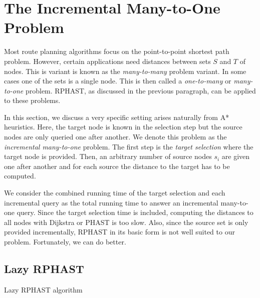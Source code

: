 \documentclass[a4paper,UKenglish,cleveref, autoref, thm-restate]{lipics-v2021}
\begin{document}
\section{The Incremental Many-to-One Problem}\label{sec:lazy-rphast}

Most route planning algorithms focus on the point-to-point shortest path problem.
However, certain applications need distances between sets $S$ and $T$ of nodes.
This is variant is known as the \emph{many-to-many} problem variant.
In some cases one of the sets is a single node.
This is then called a \emph{one-to-many} or \emph{many-to-one} problem.
RPHAST, as discussed in the previous paragraph, can be applied to these problems.

In this section, we discuss a very specific setting arises naturally from A* heuristics.
Here, the target node is known in the selection step but the source nodes are only queried one after another.
We denote this problem as the \emph{incremental many-to-one} problem.
The first step is the \emph{target selection} where the target node is provided.
Then, an arbitrary number of source nodes $s_i$ are given one after another and for each source the distance to the target has to be computed.

We consider the combined running time of the target selection and each incremental query as the total running time to answer an incremental many-to-one query.
Since the target selection time is included, computing the distances to all nodes with Dijkstra or PHAST is too slow.
Also, since the source set is only provided incrementally, RPHAST in its basic form is not well suited to our problem.
Fortunately, we can do better.

\subsection{Lazy RPHAST}

\begin{algorithm2e}
\caption{Lazy RPHAST algorithm}
\label{algo:pot}
\end{algorithm2e}
\end{document}

